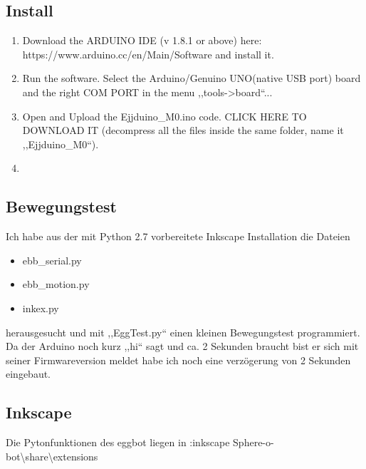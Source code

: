 \subsection{Install}
\begin{enumerate}
  \item Download the ARDUINO IDE (v 1.8.1 or above) here: https://www.arduino.cc/en/Main/Software and install it.
  \item Run the software. Select the Arduino/Genuino UNO(native USB port) board and the right COM PORT in the menu ,,tools->board``...
  \item Open and Upload the Ejjduino\_M0.ino code. CLICK HERE TO DOWNLOAD IT (decompress all the files inside the same folder, name it ,,Ejjduino\_M0``).
  \item 
\end{enumerate}

\subsection{Bewegungstest}
Ich habe aus der mit Python 2.7 vorbereitete Inkscape Installation die Dateien
\begin{itemize}
\item ebb\_serial.py
\item ebb\_motion.py
\item inkex.py
\end{itemize}
herausgesucht und mit ,,EggTest.py`` einen kleinen Bewegungstest programmiert. Da der Arduino noch kurz ,,hi`` sagt und  ca. 2 Sekunden braucht bist er sich mit seiner Firmwareversion meldet habe ich noch eine verzögerung von 2 Sekunden eingebaut.\\

\subsection{Inkscape}
Die Pytonfunktionen des eggbot liegen in :inkscape Sphere-o-bot\textbackslash share\textbackslash extensions\\
 
